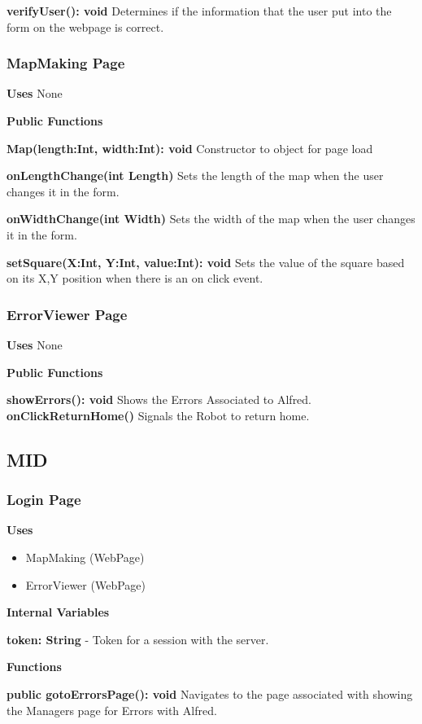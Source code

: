 \documentclass [10pt]{article}
\begin{document}
\textbf{verifyUser(): void}
Determines if the information that the user put into the form on the webpage is correct.


\subsubsection{MapMaking Page}
\textbf{Uses}
None

\textbf{Public Functions}

\textbf{ Map(length:Int, width:Int): void}
Constructor to object for page load

\textbf{onLengthChange(int Length)}
Sets the length of the map when the user changes it in the form.

\textbf{onWidthChange(int Width)}
Sets the width of the map when the user changes it in the form.

\textbf{setSquare(X:Int, Y:Int, value:Int): void}
Sets the value of the square based on its X,Y position when there is an on click event.

\subsubsection{ErrorViewer Page}
\textbf{Uses}
None

\textbf{Public Functions}

\textbf{ showErrors(): void}
Shows the Errors Associated to Alfred.
\textbf{onClickReturnHome()}
Signals the Robot to return home.

\subsection{MID}

\subsubsection{Login Page}
\textbf{Uses}
\begin{itemize}
	\item MapMaking (WebPage)
	\item ErrorViewer (WebPage)
\end{itemize}


\textbf{Internal Variables}

\textbf{token: String} - Token for a session with the server.


\textbf{Functions}

\textbf{public gotoErrorsPage(): void}
Navigates to the page associated with showing the Managers page for Errors with Alfred.
\end{document}
